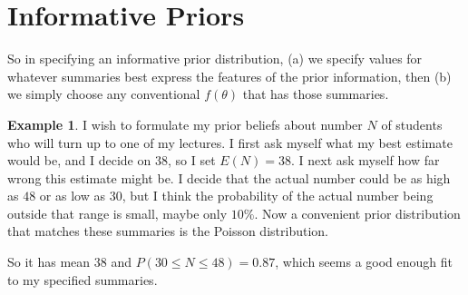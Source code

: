 \documentclass[lecture,12pt,]{pcms-l}
\numberwithin{section}{chapter}
\numberwithin{equation}{chapter}
\theoremstyle{plain}
\theoremstyle{definition}
\newtheorem{example}{Example}[section]
\theoremstyle{definition}
\begin{document}
\section{Informative Priors}
So in specifying an informative prior distribution, (a) we specify values for whatever summaries best express the features of the prior information, then (b) we simply choose any conventional $f(\theta)$ that has those summaries.
\begin{example}
I wish to formulate my prior beliefs about number $N$ of students who will turn up to one of my lectures. I first ask myself what my best estimate would be, and I decide on $38$, so I set $E(N)=38$. I next ask myself how far wrong this estimate might be. I decide that the  actual number  could be as high as $48$ or as low as $30$, but I think the probability of the actual number being outside that range is small, maybe only $10 \%$. Now a convenient prior distribution that matches these summaries is the Poisson distribution. 

So it has mean $38$ and $P(30 \leq N \leq 48)=0.87$, which seems a good enough fit to my specified summaries.  
\end{example}
\end{document}
